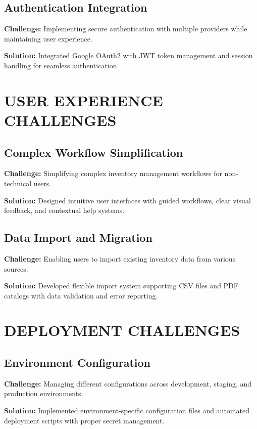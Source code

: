 \subsection{Authentication Integration}

\textbf{Challenge:} Implementing secure authentication with multiple providers while maintaining user experience.

\textbf{Solution:} Integrated Google OAuth2 with JWT token management and session handling for seamless authentication.

\section{USER EXPERIENCE CHALLENGES}

\subsection{Complex Workflow Simplification}

\textbf{Challenge:} Simplifying complex inventory management workflows for non-technical users.

\textbf{Solution:} Designed intuitive user interfaces with guided workflows, clear visual feedback, and contextual help systems.

\subsection{Data Import and Migration}

\textbf{Challenge:} Enabling users to import existing inventory data from various sources.

\textbf{Solution:} Developed flexible import system supporting CSV files and PDF catalogs with data validation and error reporting.

\section{DEPLOYMENT CHALLENGES}

\subsection{Environment Configuration}

\textbf{Challenge:} Managing different configurations across development, staging, and production environments.

\textbf{Solution:} Implemented environment-specific configuration files and automated deployment scripts with proper secret management.

